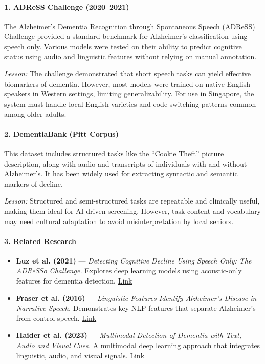 \documentclass[12pt]{article}
\begin{document}
\paragraph{1. ADReSS Challenge (2020–2021)}  
The Alzheimer's Dementia Recognition through Spontaneous Speech (ADReSS) Challenge provided a standard benchmark for Alzheimer's classification using speech only. Various models were tested on their ability to predict cognitive status using audio and linguistic features without relying on manual annotation.

\textit{Lesson:} The challenge demonstrated that short speech tasks can yield effective biomarkers of dementia. However, most models were trained on native English speakers in Western settings, limiting generalizability. For use in Singapore, the system must handle local English varieties and code-switching patterns common among older adults.

\paragraph{2. DementiaBank (Pitt Corpus)}  
This dataset includes structured tasks like the “Cookie Theft” picture description, along with audio and transcripts of individuals with and without Alzheimer’s. It has been widely used for extracting syntactic and semantic markers of decline.

\textit{Lesson:} Structured and semi-structured tasks are repeatable and clinically useful, making them ideal for AI-driven screening. However, task content and vocabulary may need cultural adaptation to avoid misinterpretation by local seniors.

\paragraph{3. Related Research}
\begin{itemize}
    \item \textbf{Luz et al. (2021)} — \textit{Detecting Cognitive Decline Using Speech Only: The ADReSSo Challenge.}  
    Explores deep learning models using acoustic-only features for dementia detection.  
    \href{https://www.isca-archive.org/interspeech_2021/luz21_interspeech.pdf}{Link}

    \item \textbf{Fraser et al. (2016)} — \textit{Linguistic Features Identify Alzheimer’s Disease in Narrative Speech.}  
    Demonstrates key NLP features that separate Alzheimer’s from control speech.  
    \href{https://www.ncbi.nlm.nih.gov/pmc/articles/PMC5008596/}{Link}

    \item \textbf{Haider et al. (2023)} — \textit{Multimodal Detection of Dementia with Text, Audio and Visual Cues.}  
    A multimodal deep learning approach that integrates linguistic, audio, and visual signals.  
    \href{https://arxiv.org/abs/2302.03064}{Link}
\end{itemize}
\end{document}

